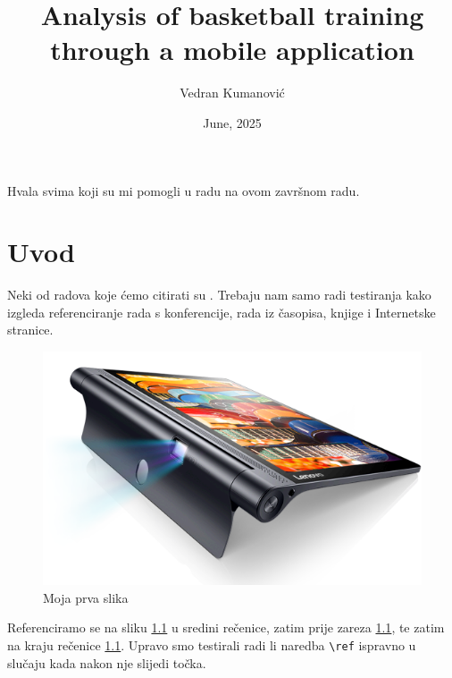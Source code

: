 \documentclass[zavrsnirad]{fer}
\title{Analysis of basketball training through a mobile application}
\author{Vedran Kumanović}
\date{June, 2025}
\begin{document}
\maketitle






\begin{zahvale}
  Hvala svima koji su mi pomogli u radu na ovom završnom radu.
  
\end{zahvale}


\mainmatter


\tableofcontents


\chapter{Uvod}
\label{pog:uvod}

Neki od radova koje ćemo citirati su \cite{6248073,6247753,ghiglia_pritt_phase_unwrapping,hartley2003multiple,4250461,123DCatch}.
Trebaju nam samo radi testiranja kako izgleda referenciranje rada s konferencije, rada iz časopisa, knjige i Internetske stranice.

\begin{figure}[htb]
  \centering
  \includegraphics[width=0.38\linewidth]{Figures/lenovo_yoga_tab3_pro_front.png} 
  \caption{Moja prva slika}
  \label{slk:prvaslika}
\end{figure}

Referenciramo se na sliku \ref{slk:prvaslika} u sredini rečenice, zatim prije zareza \ref{slk:prvaslika}, te zatim na kraju rečenice \ref{slk:prvaslika}.
Upravo smo testirali radi li naredba \verb|\ref| ispravno u slučaju kada nakon nje slijedi točka.
\end{document}
